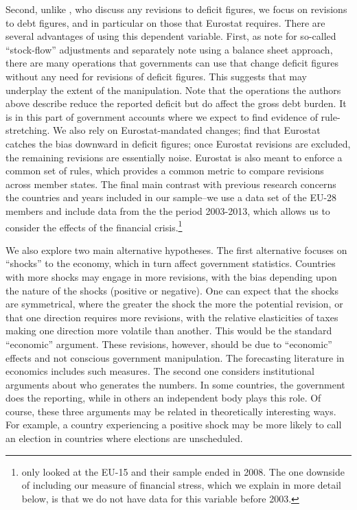 \documentclass[]{article}
\begin{document}
Second, unlike \cite{DeCastro2013} , who discuss any revisions to deficit figures, we focus on  revisions to debt figures, and in particular on those that Eurostat requires. There are several advantages of using this dependent variable. First, as \cite{vonHagenWolff2006} note for so-called ``stock-flow'' adjustments and \cite{MilesiMoriyama2006}  separately note using a balance sheet approach, there are many operations that governments can use that change deficit figures without any need for revisions of deficit figures. This suggests that \cite{DeCastro2013} may underplay the extent of the manipulation. Note that the operations the authors above describe reduce the reported deficit but do affect the gross debt burden. It is in this part of government accounts where we expect to find evidence of rule-stretching. We also rely on Eurostat-mandated changes;  \cite{DeCastro2013} find that Eurostat catches the bias downward in deficit figures; once Eurostat revisions are excluded, the remaining revisions are essentially noise. Eurostat is also meant to enforce a common set of rules, which provides a common metric to compare revisions across member states. The final main contrast with previous research concerns the countries and years included in our sample--we use a data set of the EU-28 members and include data from the the period 2003-2013, which allows us to consider the effects of the financial crisis.\footnote{\cite{DeCastro2013} only looked at the EU-15 and their sample ended in 2008. The one downside of including our measure of financial stress, which we explain in more detail below, is that we do not have data for this variable before 2003.}

We also explore two main alternative hypotheses. The first alternative focuses on ``shocks'' to the economy, which in turn affect government statistics. Countries with more shocks may engage in more revisions, with the bias depending upon the nature of the shocks (positive or negative). One can expect that the shocks are symmetrical, where the greater the shock the more the potential revision, or that one direction requires more revisions, with  the relative elasticities of taxes making one direction more volatile than another. This would be the standard ``economic'' argument. These revisions, however, should be due to ``economic'' effects and not conscious government manipulation. The forecasting literature in economics includes such measures. The second one considers institutional arguments about who generates the numbers. In some countries, the government does the reporting, while in others an independent body plays this role. Of course, these three arguments may be related in theoretically interesting ways. For example, a country experiencing a positive shock may be more likely to call an election in countries where elections are unscheduled.
\end{document}
